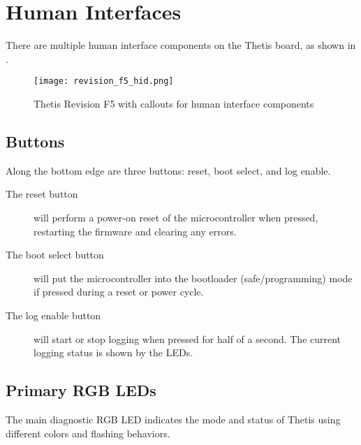\section{Human Interfaces}

There are multiple human interface components on the Thetis board, as shown in .

\begin{figure}[h!]
    \centering
    \texttt{[image: revision\_f5\_hid.png]}
    \caption{Thetis Revision F5 with callouts for human interface components}
\end{figure}

\subsection{Buttons} \label{sec:buttons}
Along the bottom edge are three buttons: reset, boot select, and log enable.

\begin{description}
    \item[The reset button] will perform a power-on reset of the microcontroller when pressed, restarting the firmware and clearing any errors.
    \item[The boot select button] will put the microcontroller into the bootloader (safe/programming) mode if pressed during a reset or power cycle. 
    \item[The log enable button] will start or stop logging when pressed for half of a second. The current logging status is shown by the LEDs. 
\end{description}

\subsection{Primary \acs{RGB} \acsp{LED}}
\label{sec:led}

The main diagnostic \ac{RGB} \ac{LED} indicates the mode and status of Thetis using different colors and flashing behaviors.

\newcommand{\ledFigure}[3]{
    \begin{figure}[H]
        \centering
        \texttt{[image: LEDs/\#1.png]}
        \caption{#2}
        \label{fig:#3}
    \end{figure}
}

\newcommand{\ledBlinkFigure}[6]{
    \begin{figure}[H]
        \centering
        \subfloat[#2]{\texttt{[image: LEDs/\#1.png]} \label{subfig:#6_#1}} \hskip3ex
        \subfloat[#4]{\texttt{[image: LEDs/\#3.png]} \label{subfig:#6_#2}}
        \caption{#5}
        \label{fig:#6}
    \end{figure}
}

